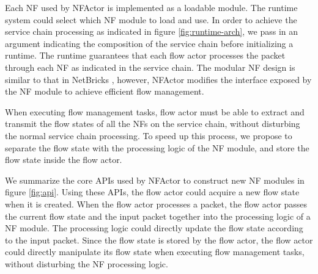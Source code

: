 
Each NF used by NFActor is implemented as a loadable module. The runtime system could select which NF module to load and use. In order to achieve the service chain processing as indicated in figure \ref{fig:runtime-arch}, we pass in an argument indicating the composition of the service chain before initializing a runtime. The runtime guarantees that each flow actor processes the packet through each NF as indicated in the service chain. The modular NF design is similar to that in NetBricks \cite{199352}, however, NFActor modifies the interface exposed by the NF module to achieve efficient flow management.


When executing flow management tasks, flow actor must be able to extract and transmit the flow states of all the NFs on the service chain, without disturbing the normal service chain processing. To speed up this process, we propose to separate the flow state with the processing logic of the NF module, and store the flow state inside the flow actor.

We summarize the core APIs used by NFActor to construct new NF modules in figure \ref{fig:api}. Using these APIs, the flow actor could acquire a new flow state when it is created. When the flow actor processes a packet, the flow actor passes the current flow state and the input packet together into the processing logic of a NF module. The processing logic could directly update the flow state according to the input packet. Since the flow state is stored by the flow actor, the flow actor could directly manipulate its flow state when executing flow management tasks, without disturbing the NF processing logic.

